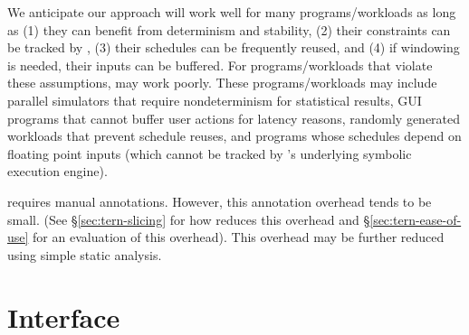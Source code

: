 
 We anticipate our approach will work well for many
programs/workloads as long as (1) they can benefit from determinism and
stability, (2) their constraints can be tracked by \tern, (3) their
schedules can be frequently reused, and (4) if windowing is needed, their
inputs can be buffered.  For programs/workloads that
violate these assumptions, \tern may work poorly.  These programs/workloads
may include parallel simulators that require nondeterminism for
statistical results, GUI programs that cannot buffer user actions for
latency reasons, randomly generated workloads that prevent schedule
reuses, and programs whose schedules depend on floating point inputs
(which cannot be tracked by \tern's underlying symbolic execution engine).


 \tern requires manual annotations.  However, this
annotation overhead tends to be small.  (See \S\ref{sec:tern-slicing} for how
\tern reduces this overhead and \S\ref{sec:tern-ease-of-use} for an evaluation
of this overhead).  This overhead may be further reduced using simple static
analysis.



\section{Interface}  \label{sec:tern-annotations}

